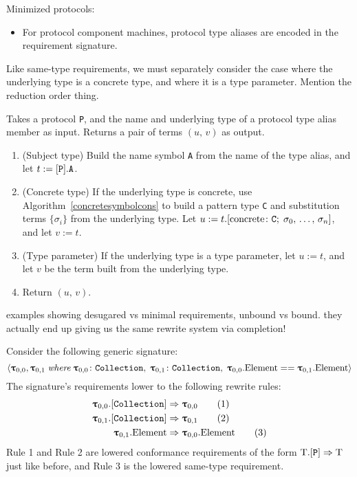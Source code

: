 \documentclass[../generics]{subfiles}
\begin{document}
Minimized protocols:
\begin{itemize}
\item For protocol component machines, protocol type aliases are encoded in the requirement signature. 
\end{itemize}

Like same-type requirements, we must separately consider the case where the underlying type is a concrete type, and where it is a type parameter. Mention the reduction order thing.

\begin{algorithm}
Takes a protocol \texttt{P}, and the name and underlying type of a protocol type alias member as input. Returns a pair of terms $(u,\,v)$ as output.
\begin{enumerate}
\item (Subject type) Build the name symbol \texttt{A} from the name of the type alias, and let $t := [\texttt{P}].\texttt{A}$.
\item (Concrete type) If the underlying type is concrete, use Algorithm~\ref{concretesymbolcons} to build a pattern type \texttt{C} and substitution terms $\{\sigma_i\}$ from the underlying type. Let $u := t.[\mathrm{concrete}\colon \texttt{C};\;\sigma_0,\,\ldots,\,\sigma_n]$, and let $v := t$.
\item (Type parameter) If the underlying type is a type parameter, let $u := t$, and let $v$ be the term built from the underlying type.
\item Return $(u,\,v)$.
\end{enumerate}
\end{algorithm}

examples showing desugared vs minimal requirements, unbound vs bound. they actually end up giving us the same rewrite system via completion!

Consider the following generic signature:
\[\langle \bm{\uptau}_{0,0},\bm{\uptau}_{0,1}\;\textit{where}\;\bm{\uptau}_{0,0}\colon\texttt{Collection},\;\bm{\uptau}_{0,1}\colon\texttt{Collection},\;\bm{\uptau}_{0,0}.\mathrm{Element}==\bm{\uptau}_{0,1}.\mathrm{Element}\rangle\]
The signature's requirements lower to the following rewrite rules:
\begin{align}
\bm{\uptau}_{0,0}.[\texttt{Collection}]&\Rightarrow\bm{\uptau}_{0,0}\tag{1}\\
\bm{\uptau}_{0,1}.[\texttt{Collection}]&\Rightarrow\bm{\uptau}_{0,1}\tag{2}\\
\bm{\uptau}_{0,1}.\mathrm{Element}&\Rightarrow\bm{\uptau}_{0,0}.\mathrm{Element}\tag{3}
\end{align}
Rule 1 and Rule 2 are lowered conformance requirements of the form $\mathrm{T}.[\texttt{P}]\Rightarrow\mathrm{T}$ just like before, and Rule 3 is the lowered same-type requirement.
\end{document}
